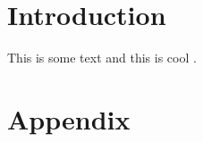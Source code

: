 \documentclass{capstone-project}
\begin{document}


\chapter{Introduction}

This is some text and this is cool \cite{einstein}.




\appendix
\chapter{Appendix}
\end{document}
